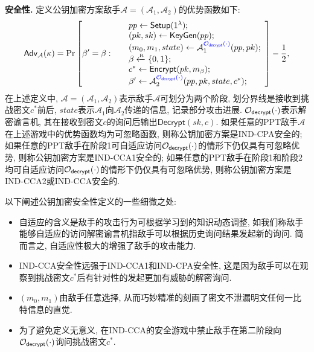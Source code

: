 \begin{trivlist}
\item \textbf{安全性.} 定义公钥加密方案敌手$\mathcal{A} = (\mathcal{A}_1, \mathcal{A}_2)$的优势函数如下: 
\begin{displaymath}
	\mathsf{Adv}_\mathcal{A}(\kappa) = \Pr \left[ \beta' = \beta:~
	\begin{array}{ll}
		& pp \leftarrow \mathsf{Setup}(1^\lambda); \\		
		& (pk, sk) \leftarrow \mathsf{KeyGen}(pp);\\
		& (m_0, m_1, state) \leftarrow \mathcal{A}_1^{{\color{blue} \mathcal{O}_\mathsf{decrypt}(\cdot)}}(pp, pk); \\
		& \beta \xleftarrow{\textup{\tiny R}} \{0,1\};\\ 
        & c^* \leftarrow \mathsf{Encrypt}(pk, m_\beta);\\
        & \beta' \leftarrow \mathcal{A}_2^{{\color{blue} \mathcal{O}_\mathsf{decrypt}(\cdot)}}(pp, pk, state, c^*);
	\end{array} 
\right] - \frac{1}{2},
\end{displaymath}
在上述定义中, $\mathcal{A} = (\mathcal{A}_1, \mathcal{A}_2)$表示敌手$\mathcal{A}$可划分为两个阶段, 
划分界线是接收到挑战密文$c^*$前后, $state$表示$\mathcal{A}_1$向$\mathcal{A}_2$传递的信息, 记录部分攻击进展.  
$\mathcal{O}_\mathsf{decrypt}(\cdot)$表示解密谕言机, 其在接收到密文$c$的询问后输出$\mathsf{Decrypt}(sk, c)$. 
如果任意的PPT敌手$\mathcal{A}$在上述游戏中的优势函数均为可忽略函数, 则称公钥加密方案是IND-CPA安全的;  
如果任意的PPT敌手在阶段1可自适应访问$\mathcal{O}_\mathsf{decrypt}(\cdot)$的情形下仍仅具有可忽略优势, 则称公钥加密方案是IND-CCA1安全的; 
如果任意的PPT敌手在阶段1和阶段2均可自适应访问$\mathcal{O}_\mathsf{decrypt}(\cdot)$的情形下仍仅具有可忽略优势, 
则称公钥加密方案是IND-CCA2或IND-CCA安全的.  
\end{trivlist}

以下阐述公钥加密安全性定义的一些细微之处: 
\begin{itemize}
\item 自适应的含义是敌手的攻击行为可根据学习到的知识动态调整, 如我们称敌手能够自适应的访问解密谕言机指敌手可以根据历史询问结果发起新的询问. 
	简而言之, 自适应性极大的增强了敌手的攻击能力.  

\item IND-CCA安全性远强于IND-CCA1和IND-CPA安全性, 这是因为敌手可以在观察到挑战密文$c^*$后有针对性的发起更加有威胁的解密询问. 

\item $(m_0, m_1)$由敌手任意选择, 从而巧妙精准的刻画了密文不泄漏明文任何一比特信息的直觉. 

\item 为了避免定义无意义, 在IND-CCA的安全游戏中禁止敌手在第二阶段向$\mathcal{O}_\mathsf{decrypt}(\cdot)$询问挑战密文$c^*$.  
\end{itemize}

